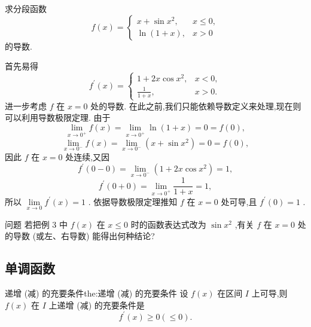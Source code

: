 \begin{example}
求分段函数
\[
f\left( x\right)  = \left\{  \begin{array}{ll} x + \sin {x}^{2}, & x \leq  0, \\  \ln \left( {1 + x}\right) , & x > 0 \end{array}\right.
\]
的导数.
\end{example}


\begin{solution}
首先易得
\[
{f}^{\prime }\left( x\right)  = \left\{  \begin{array}{ll} 1 + {2x}\cos {x}^{2}, & x < 0, \\  \frac{1}{1 + x}, & x > 0. \end{array}\right.
\]
进一步考虑 \(f\) 在 \(x = 0\) 处的导数. 在此之前,我们只能依赖导数定义来处理,现在则可以利用导数极限定理. 由于
\[
\mathop{\lim }\limits_{{x \rightarrow  {0}^{ + }}}f\left( x\right)  = \mathop{\lim }\limits_{{x \rightarrow  {0}^{ + }}}\ln \left( {1 + x}\right)  = 0 = f\left( 0\right) ,
\]
\[
\mathop{\lim }\limits_{{x \rightarrow  {0}^{ - }}}f\left( x\right)  = \mathop{\lim }\limits_{{x \rightarrow  {0}^{ - }}}\left( {x + \sin {x}^{2}}\right)  = 0 = f\left( 0\right) ,
\]
因此 \(f\) 在 \(x = 0\) 处连续,又因
\[
{f}^{\prime }\left( {0 - 0}\right)  = \mathop{\lim }\limits_{{x \rightarrow  {0}^{ - }}}\left( {1 + {2x}\cos {x}^{2}}\right)  = 1,
\]
\[
{f}^{\prime }\left( {0 + 0}\right)  = \mathop{\lim }\limits_{{x \rightarrow  {0}^{ + }}}\frac{1}{1 + x} = 1,
\]
所以 \(\mathop{\lim }\limits_{{x \rightarrow  0}}{f}^{\prime }\left( x\right)  = 1\) . 依据导数极限定理推知 \(f\) 在 \(x = 0\) 处可导,且 \({f}^{\prime }\left( 0\right)  = 1\) .
\end{solution}


问题 若把例 3 中 \(f\left( x\right)\) 在 \(x \leq  0\) 时的函数表达式改为 \(\sin {x}^{2}\) ,有关 \(f\) 在 \(x = 0\) 处的导数 (或左、右导数) 能得出何种结论?

\subsection{单调函数}

\begin{theorem}{递增 (减) 的充要条件}{the:递增 (减) 的充要条件}
设 \(f\left( x\right)\) 在区间 \(I\) 上可导,则 \(f\left( x\right)\) 在 \(I\) 上递增 (减) 的充要条件是
\[
{f}^{\prime }\left( x\right)  \geq  0\left( { \leq  0}\right) .
\]
\end{theorem}


